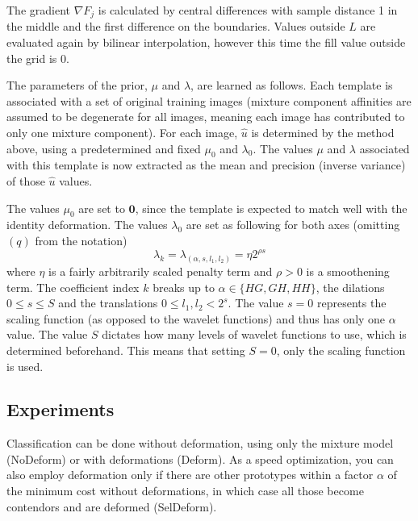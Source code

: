 \documentclass{report}
\begin{document}
The gradient $\nabla F_j$ is calculated by central differences with sample distance 1 in the middle and the first difference on the boundaries. Values outside $L$ are evaluated again by bilinear interpolation, however this time the fill value outside the grid is 0.

The parameters of the prior, $\mu$ and $\lambda$, are learned as follows. Each template is associated with a set of original training images (mixture component affinities are assumed to be degenerate for all images, meaning each image has contributed to only one mixture component). For each image, $\hat u$ is determined by the method above, using a predetermined and fixed $\mu_0$ and $\lambda_0$. The values $\mu$ and $\lambda$ associated with this template is now extracted as the mean and precision (inverse variance) of those $\hat u$ values.

The values $\mu_0$ are set to $\mathbf{0}$, since the template is expected to match well with the identity deformation. The values $\lambda_0$ are set as following for both axes (omitting $(q)$ from the notation)
\[
    \lambda_{k} = \lambda_{(\alpha, s, l_1, l_2)} = \eta 2^{\rho s}
\]
where $\eta$ is a fairly arbitrarily scaled penalty term and $\rho > 0$ is a smoothening term. The coefficient index $k$ breaks up to $\alpha \in \{HG, GH, HH\}$, the dilations $0 \le s \le S$ and the translations $0 \le l_1, l_2 < 2^s$. The value $s = 0$ represents the scaling function (as opposed to the wavelet functions) and thus has only one $\alpha$ value. The value $S$ dictates how many levels of wavelet functions to use, which is determined beforehand. This means that setting $S=0$, only the scaling function is used.



\subsection{Experiments}
Classification can be done without deformation, using only the mixture model (NoDeform) or with deformations (Deform). As a speed optimization, you can also employ deformation only if there are other prototypes within a factor $\alpha$ of the minimum cost without deformations, in which case all those become contendors and are deformed (SelDeform).
\end{document}
